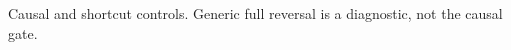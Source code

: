 \begin{table}[t]\centering\scriptsize
\caption{Causal and shortcut controls. Generic full reversal is a diagnostic, not the causal gate.}
\resizebox{\textwidth}{!}{}
\end{table}
